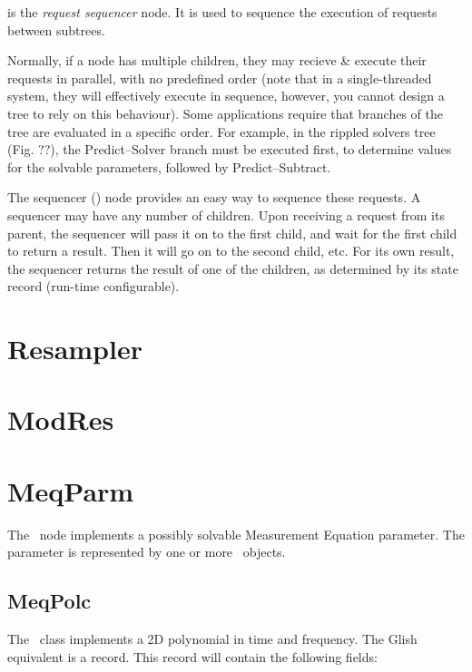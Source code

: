    is the {\em request sequencer} node. It is used to sequence the
  execution of requests between subtrees.
  
  Normally, if a node has multiple children, they may recieve \& execute their
  requests in parallel, with no predefined order (note that in a
  single-threaded system, they will effectively execute in sequence, however,
  you cannot design a tree to rely on this behaviour). Some applications
  require that branches of the tree are evaluated in a specific order. For
  example, in the rippled solvers tree (Fig. ??), the Predict--Solver branch
  must be executed first, to determine values for the solvable parameters,
  followed by Predict--Subtract.
  
  The sequencer () node provides an easy way to sequence these
  requests. A sequencer may have any number of children. Upon receiving a
  request from its parent, the sequencer will pass it on to the first child,
  and wait for the first child to return a result. Then it will go on to the
  second child, etc. For its own result, the sequencer returns the result of
  one of the children, as determined by its state record (run-time
  configurable).

\section{Resampler}

\section{ModRes}

\section{MeqParm}

  The \Parm\ node implements a possibly solvable Measurement Equation
  parameter. The parameter is represented by one or more \Polc\ objects.

\subsection{MeqPolc}

  The \Polc\ class implements a 2D polynomial in time and frequency. The Glish
  equivalent is a  record. This record will contain the following
  fields:
  
